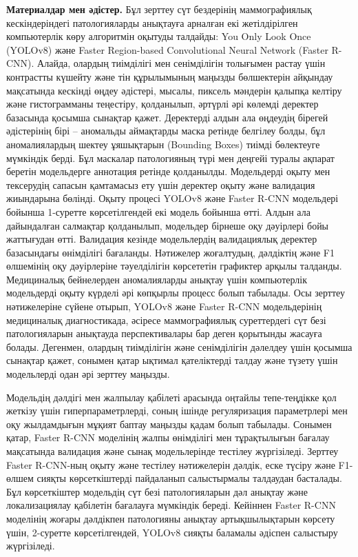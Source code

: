 {\bfseries Материалдар мен әдістер.} Бұл зерттеу сүт бездерінің
маммографиялық кескіндеріндегі патологияларды анықтауға арналған екі
жетілдірілген компьютерлік көру алгоритмін оқытуды талдайды: You Only
Look Once (YOLOv8) және Faster Region-based Convolutional Neural Network
(Faster R-CNN). Алайда, олардың тиімділігі мен сенімділігін толығымен
растау үшін контрастты күшейту және тін құрылымының маңызды бөлшектерін
айқындау мақсатында кескінді өңдеу әдістері, мысалы, пиксель мәндерін
қалыпқа келтіру және гистограмманы теңестіру, қолданылып, әртүрлі әрі
көлемді деректер базасында қосымша сынақтар қажет. Деректерді алдын ала
өңдеудің бірегей әдістерінің бірі -- аномальды аймақтарды маска ретінде
белгілеу болды, бұл аномалиялардың шектеу ұяшықтарын (Bounding Boxes)
тиімді бөлектеуге мүмкіндік берді. Бұл маскалар патологияның түрі мен
деңгейі туралы ақпарат беретін модельдерге аннотация ретінде қолданылды.
Модельдерді оқыту мен тексерудің сапасын қамтамасыз ету үшін деректер
оқыту және валидация жиындарына бөлінді. Оқыту процесі YOLOv8 және
Faster R-CNN модельдері бойынша 1-суретте көрсетілгендей екі модель
бойынша өтті. Алдын ала дайындалған салмақтар қолданылып, модельдер
бірнеше оқу дәуірлері бойы жаттығудан өтті. Валидация кезінде
модельлердің валидациялық деректер базасындағы өнімділігі бағаланды.
Нәтижелер жоғалтудың, дәлдіктің және F1 өлшемінің оқу дәуірлеріне
тәуелділігін көрсететін графиктер арқылы талданды. Медициналық
бейнелерден аномалияларды анықтау үшін компьютерлік модельдерді оқыту
күрделі әрі көпқырлы процесс болып табылады. Осы зерттеу нәтижелеріне
сүйене отырып, YOLOv8 және Faster R-CNN модельдерінің медициналық
диагностикада, әсіресе маммографиялық суреттердегі сүт безі
патологияларын анықтауда перспективалары бар деген қорытынды жасауға
болады. Дегенмен, олардың тиімділігін және сенімділігін дәлелдеу үшін
қосымша сынақтар қажет, сонымен қатар ықтимал қателіктерді талдау және
түзету үшін модельлерді одан әрі зерттеу маңызды.

Модельдің дәлдігі мен жалпылау қабілеті арасында оңтайлы тепе-теңдікке
қол жеткізу үшін гиперпараметрлерді, соның ішінде регуляризация
параметрлері мен оқу жылдамдығын мұқият баптау маңызды қадам болып
табылады. Сонымен қатар, Faster R-CNN моделінің жалпы өнімділігі мен
тұрақтылығын бағалау мақсатында валидация және сынақ модельлерінде
тестілеу жүргізіледі. Зерттеу Faster R-CNN-ның оқыту және тестілеу
нәтижелерін дәлдік, еске түсіру және F1-өлшем сияқты көрсеткіштерді
пайдаланып салыстырмалы талдаудан басталады. Бұл көрсеткіштер модельдің
сүт безі патологияларын дәл анықтау және локализациялау қабілетін
бағалауға мүмкіндік береді. Кейіннен Faster R-CNN моделінің жоғары
дәлдікпен патологияны анықтау артықшылықтарын көрсету үшін, 2-суретте
көрсетілгендей, YOLOv8 сияқты баламалы әдіспен салыстыру жүргізіледі.

